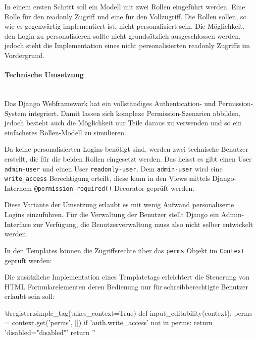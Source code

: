 In einem ersten Schritt soll ein Modell mit zwei Rollen eingeführt werden. Eine
Rolle für den readonly Zugriff und eine für den Vollzugriff. Die Rollen sollen,
so wie es gegenwärtig implementiert ist, nicht personalisiert sein. Die
Möglichkeit, den Login zu personalisieren sollte nicht grundsätzlich
ausgeschlossen werden, jedoch steht die Implementation eines nicht
personalisierten readonly Zugriffs im Vordergrund.

\paragraph{Technische Umsetzung} \hspace{0pt} \\
Das Django Webframework hat ein vollständiges Authentication- und
Permission-System integriert. Damit lassen sich komplexe Permission-Szenarien
abbilden, jedoch besteht auch die Möglichkeit nur Teile daraus zu verwenden und
so ein einfacheres Rollen-Modell zu simulieren.

Da keine personalisierten Logins benötigt sind, werden zwei technische Benutzer
erstellt, die für die beiden Rollen eingesetzt werden. Das heisst es gibt einen
User \texttt{admin-user} und einen User \texttt{readonly-user}. Dem
\texttt{admin-user} wird eine \texttt{write\_access} Berechtigung erteilt, diese
kann in den Views mittels Django-Internem \texttt{@permission\_required()}
Decorator geprüft werden.

Diese Variante der Umsetzung erlaubt es mit wenig Aufwand personaliserte Logins
einzuführen. Für die Verwaltung der Benutzer stellt Django ein Admin-Interface
zur Verfügung, die Benutzerverwaltung muss also nicht selber entwickelt werden.

In den Templates können die Zugriffsrechte über das \texttt{perms} Objekt im
\texttt{Context} geprüft werden:


Die zusätzliche Implementation eines Templatetags erleichtert die Steuerung von HTML Formularelementen deren Bedienung nur für schreibberechtigte Benutzer erlaubt sein soll:

\begin{pythoncode}
@register.simple_tag(takes_context=True)
def input_editability(context):
    perms = context.get('perms', [])
    if 'auth.write_access' not in perms:
        return 'disabled="disabled"'
    return ''
\end{pythoncode}

